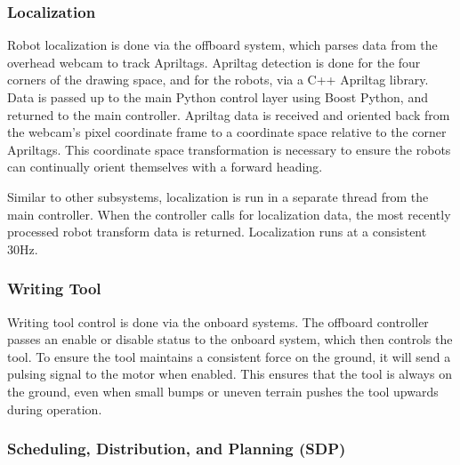 \subsubsection{Localization}
\label{sec:sw_localization}
Robot localization is done via the offboard system, which parses data from the overhead webcam to track Apriltags. Apriltag detection is done for the four corners of the drawing space, and for the robots, via a C++ Apriltag library. Data is passed up to the main Python control layer using Boost Python, and returned to the main controller. Apriltag data is received and oriented back from the webcam's pixel coordinate frame to a coordinate space relative to the corner Apriltags. This coordinate space transformation is necessary to ensure the robots can continually orient themselves with a forward heading.

Similar to other subsystems, localization is run in a separate thread from the main controller. When the controller calls for localization data, the most recently processed robot transform data is returned. Localization runs at a consistent 30Hz.

\subsubsection{Writing Tool}
\label{sec:sw_writing}
Writing tool control is done via the onboard systems. The offboard controller passes an enable or disable status to the onboard system, which then controls the tool. To ensure the tool maintains a consistent force on the ground, it will send a pulsing signal to the motor when enabled. This ensures that the tool is always on the ground, even when small bumps or uneven terrain pushes the tool upwards during operation.

\subsubsection{Scheduling, Distribution, and Planning (SDP)}
\label{sec:sw_sdp}


